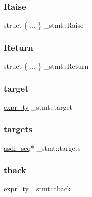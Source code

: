 \mbox{\label{struct__stmt_a236554e9d881db57cd4899f8c406c2c5}} 
\subsubsection{\texorpdfstring{Raise}{Raise}}
{\footnotesize\ttfamily struct \{ ... \}   \+\_\+stmt\+::\+Raise}

\mbox{\label{struct__stmt_addd6e63107fdcd99caa5449e87aee467}} 
\subsubsection{\texorpdfstring{Return}{Return}}
{\footnotesize\ttfamily struct \{ ... \}   \+\_\+stmt\+::\+Return}

\mbox{\label{struct__stmt_a177714ebb9716b3f8ffcdf8d4fb38e2e}} 
\subsubsection{\texorpdfstring{target}{target}}
{\footnotesize\ttfamily \mbox{\hyperlink{_python-ast_8h_a56d3705e020a071405094a220c4592bd}{expr\+\_\+ty}} \+\_\+stmt\+::target}

\mbox{\label{struct__stmt_aebed3a44ab223eae478f739ea80f28d0}} 
\subsubsection{\texorpdfstring{targets}{targets}}
{\footnotesize\ttfamily \mbox{\hyperlink{structasdl__seq}{asdl\+\_\+seq}}$\ast$ \+\_\+stmt\+::targets}

\mbox{\label{struct__stmt_a32ce23a33f8440a8bdae1ee04e4bd87f}} 
\subsubsection{\texorpdfstring{tback}{tback}}
{\footnotesize\ttfamily \mbox{\hyperlink{_python-ast_8h_a56d3705e020a071405094a220c4592bd}{expr\+\_\+ty}} \+\_\+stmt\+::tback}

